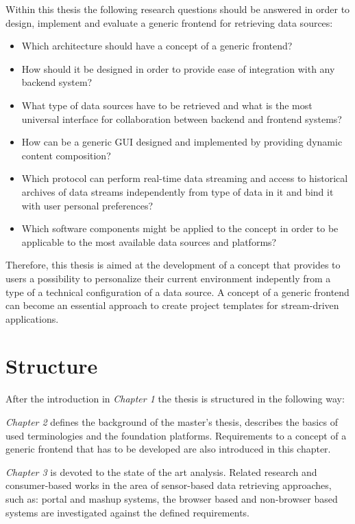        Within this thesis the following research questions should be answered in order to design, implement and evaluate a generic frontend for retrieving data sources: 
       \begin{itemize}
       \item Which architecture should have a concept of a generic frontend?
       \item How should it be designed in order to provide ease of integration with any backend system?
       \item What type of data sources have to be retrieved and what is the most universal interface for collaboration between backend and frontend systems?
       \item How can be a generic GUI designed and implemented by providing dynamic content composition?
       \item Which protocol can perform real-time data streaming and access to historical archives of data streams independently from type of data in it and bind it with user personal preferences?
       \item Which software components might be applied to the concept in order to be applicable to the most available data sources and platforms?
       \end{itemize}

     Therefore, this thesis is aimed at the development of a concept that provides to users a possibility to personalize their current environment indepently from a type of a technical configuration of a data source. A concept of a generic frontend can become an essential approach to create project templates for stream-driven applications.

\section{Structure}

After the introduction in \emph{Chapter 1} the thesis is structured in the following way:

\emph{Chapter 2} defines the background of the master's thesis, describes the basics of used terminologies and the foundation platforms. Requirements to a concept of a generic frontend that has to be developed are also introduced in this chapter.

\emph{Chapter 3} is devoted to the state of the art analysis. Related research and consumer-based works in the area of sensor-based data retrieving approaches, such as: portal and mashup systems, the browser based and non-browser based systems are investigated against the defined requirements.

